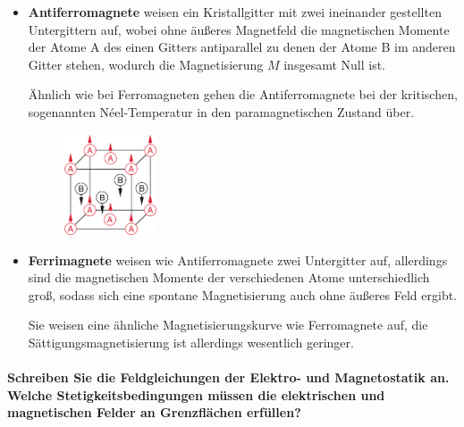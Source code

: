 \documentclass[a4paper, 11pt, ngerman, parskip=half-]{scrartcl}
\begin{document}
\begin{itemize}
    \item \textbf{Antiferromagnete} weisen ein Kristallgitter mit zwei ineinander gestellten
          Untergittern auf, wobei ohne äußeres Magnetfeld die magnetischen Momente der Atome
          A des einen Gitters antiparallel zu denen der Atome B im anderen Gitter stehen,
          wodurch die Magnetisierung $M$ insgesamt Null ist.

          Ähnlich wie bei Ferromagneten gehen die Antiferromagnete bei der kritischen,
          sogenannten Néel-Temperatur in den paramagnetischen Zustand über.

          \begin{figure}[H]
              \centering
              \includegraphics[height=3cm]{image/06/2.2}
          \end{figure}

    \item \textbf{Ferrimagnete} weisen wie Antiferromagnete zwei Untergitter auf, allerdings
          sind die magnetischen Momente der verschiedenen Atome unterschiedlich groß, sodass
          sich eine spontane Magnetisierung auch ohne äußeres Feld ergibt.

          Sie weisen eine ähnliche Magnetisierungskurve wie Ferromagnete auf, die
          Sättigungsmagnetisierung ist allerdings wesentlich geringer.
\end{itemize}

\paragraph{Schreiben Sie die Feldgleichungen der Elektro- und Magnetostatik an. Welche
    Stetigkeitsbedingungen müssen die elektrischen und magnetischen Felder an Grenzflächen erfüllen?} ~
\end{document}
